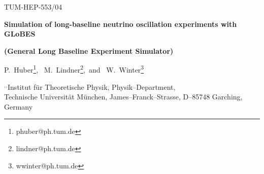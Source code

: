 \documentclass[12pt,a4paper]{article}
\begin{document}

\begin{titlepage}

\renewcommand{\thefootnote}{\alph{footnote}}

\vspace*{-3.cm}
\begin{flushright}
TUM-HEP-553/04\\
\end{flushright}

\vspace*{0.5cm}

\renewcommand{\thefootnote}{\fnsymbol{footnote}}
\setcounter{footnote}{-1}

{\begin{center}
{\Large\bf Simulation of long-baseline neutrino oscillation
experiments with GLoBES}
\end{center}}
{\begin{center}
{\large\bf (General Long Baseline Experiment Simulator)}
\end{center}}
\renewcommand{\thefootnote}{\alph{footnote}}

\vspace*{.8cm}
{\begin{center} {\large{\sc
                P.~Huber\footnote[1]{
                phuber@ph.tum.de},~
                M.~Lindner\footnote[2]{
                lindner@ph.tum.de},~and~
                W.~Winter\footnote[3]{
                wwinter@ph.tum.de}
                }}
\end{center}}
\vspace*{0cm}
{\it
\begin{center}

\footnotemark[1]${}^,$\footnotemark[2]${}^,$\footnotemark[3]%
       Institut f\"ur Theoretische Physik, Physik--Department,\\
       Technische Universit\"at M\"unchen,
       James--Franck--Strasse, D--85748 Garching, Germany


\end{center}}

\vspace*{1cm}



\end{titlepage}
\end{document}
